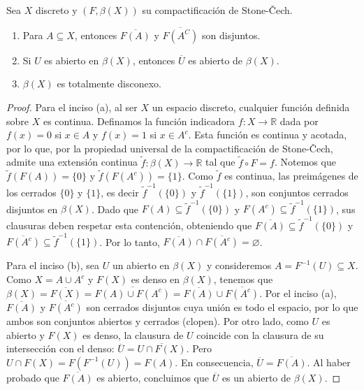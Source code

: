 \documentclass{article}
\theoremstyle{plain}
\theoremstyle{definition}
\newenvironment{ejercicio}[1]{\begin{trivlist}
\item[\hskip \labelsep {\bfseries Ejercicio}\hskip \labelsep {\bfseries #1.}]}{\end{trivlist}}
\begin{document}
\begin{ejercicio}{15}
    Sea \( X \) discreto y \( (F,\beta(X)) \) su compactificación de Stone-Čech.
    \begin{enumerate}
        \item[(a)] Para \( A\subseteq X \), entonces \( \overline{F(A)} \) y \( \overline{F(A^{C})} \) son disjuntos.
        \item[(b)] Si \( U \) es abierto en \( \beta(X) \), entonces \( \overline{U} \) es abierto de \( \beta(X) \).
        \item[(c)] \( \beta(X) \) es totalmente disconexo.
    \end{enumerate}
\end{ejercicio}
\begin{proof}
    Para el inciso (a), al ser \( X \) un espacio discreto, cualquier función definida sobre \( X \) es continua. Definamos la función indicadora \( f: X \to \mathbb{R} \) dada por \( f(x) = 0 \) si \( x \in A \) y \( f(x) = 1 \) si \( x \in A^c \). Esta función es continua y acotada, por lo que, por la propiedad universal de la compactificación de Stone-Čech, admite una extensión continua \( \tilde{f}: \beta(X) \to \mathbb{R} \) tal que \( \tilde{f} \circ F = f \).
    Notemos que \( \tilde{f}(F(A)) = \{0\} \) y \( \tilde{f}(F(A^c)) = \{1\} \). Como \( \tilde{f} \) es continua, las preimágenes de los cerrados \( \{0\} \) y \( \{1\} \), es decir \( \tilde{f}^{-1}(\{0\}) \) y \( \tilde{f}^{-1}(\{1\}) \), son conjuntos cerrados disjuntos en \( \beta(X) \). Dado que \( F(A) \subseteq \tilde{f}^{-1}(\{0\}) \) y \( F(A^c) \subseteq \tilde{f}^{-1}(\{1\}) \), sus clausuras deben respetar esta contención, obteniendo que \( \overline{F(A)} \subseteq \tilde{f}^{-1}(\{0\}) \) y \( \overline{F(A^c)} \subseteq \tilde{f}^{-1}(\{1\}) \). Por lo tanto, \( \overline{F(A)} \cap \overline{F(A^c)} = \varnothing \).

    Para el inciso (b), sea \( U \) un abierto en \( \beta(X) \) y consideremos \( A = F^{-1}(U) \subseteq X \). Como \( X = A \cup A^c \) y \( F(X) \) es denso en \( \beta(X) \), tenemos que \( \beta(X) = \overline{F(X)} = \overline{F(A) \cup F(A^c)} = \overline{F(A)} \cup \overline{F(A^c)} \). Por el inciso (a), \( \overline{F(A)} \) y \( \overline{F(A^c)} \) son cerrados disjuntos cuya unión es todo el espacio, por lo que ambos son conjuntos abiertos y cerrados (clopen).
    Por otro lado, como \( U \) es abierto y \( F(X) \) es denso, la clausura de \( U \) coincide con la clausura de su intersección con el denso: \( \overline{U} = \overline{U \cap F(X)} \). Pero \( U \cap F(X) = F(F^{-1}(U)) = F(A) \). En consecuencia, \( \overline{U} = \overline{F(A)} \). Al haber probado que \( \overline{F(A)} \) es abierto, concluimos que \( \overline{U} \) es un abierto de \( \beta(X) \).


\end{proof}
\end{document}

